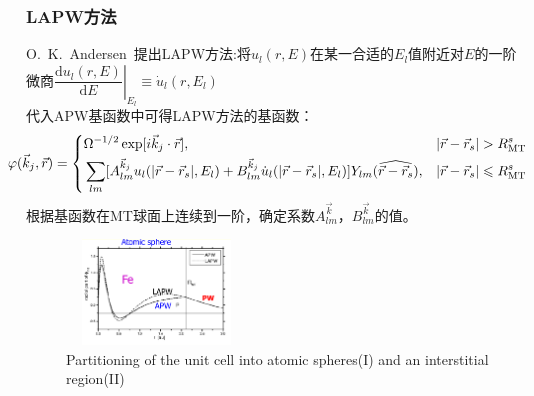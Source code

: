 \frame
{
\frametitle{\textrm{LAPW}方法}
\textrm{O.~K.~Andersen~}提出\textrm{LAPW}方法:将$u_l(r,E)$在某一合适的$E_l$值附近对$E$的一阶微商{$\left.\dfrac{\textrm{d}u_l(r,E)}{\textrm{d}E}\right|_{E_l}\equiv\dot u_l(r,E_l)$}\\代入\textrm{APW}基函数中可得\textrm{LAPW}方法的基函数：
{\fontsize{7.5pt}{3.3pt}\selectfont
$$\hskip -14pt \varphi(\vec k_j,\vec r)=\left\{
  \begin{aligned}
    &\Omega^{-1/2}\exp[i\vec k_j\cdot\vec r],&|\vec r-\vec r_s|>R_{\mathrm{MT}}^s\\
    &\sum_{lm}[A^{\vec k_j}_{lm}u_l(|\vec r-\vec r_s|,E_l)+B^{\vec k_j}_{lm}\dot u_l(|\vec r-\vec r_s|,E_l)]Y_{lm}(\widehat{\vec r-\vec r_s}),&|\vec r-\vec r_s|\leqslant R_{\mathrm{MT}}^s
  \end{aligned}
\right.$$
根据基函数在\textrm{MT}球面上连续到一阶，确定系数$A^{\vec k}_{lm}$，$B^{\vec k}_{lm}$的值。}
\begin{figure}[h!]
	\vskip -3pt
\centering
\includegraphics[height=1.10in,width=1.88in,viewport=1 20 585 435,clip]{Figures/WIEN2k-LAPW.png}
\caption{\tiny \textrm{Partitioning of the unit cell into atomic spheres(I) and an interstitial region(II)}}%
\label{Muffin_tin-3}
\end{figure}
}

